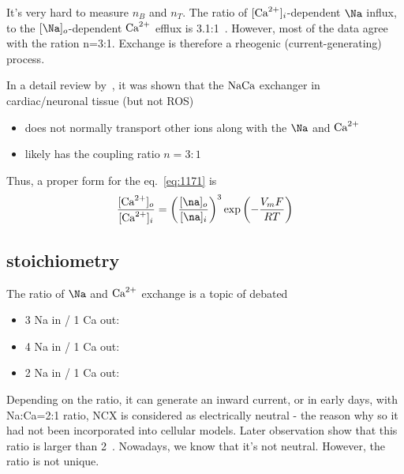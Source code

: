 It's very hard to measure $n_B$ and $n_T$. The ratio of $[{\text{Ca}^{2+}}]_i$-dependent
$\Na$ influx, to the $[\Na]_o$-dependent ${\text{Ca}^{2+}}$ efflux is
3.1:1~\citep{blaustein1975}. However, most of the data agree with the ration
n=3:1. Exchange is therefore a rheogenic (current-generating) process.


In a detail review by~\citep{blaustein1999}, it was shown that the
${\text{NaCa}}$ exchanger in cardiac/neuronal tissue (but not ROS)
\begin{itemize}
\item does not normally transport other ions along with the $\Na$ and ${\text{Ca}^{2+}}$
\item likely has the coupling ratio $n=3:1$
\end{itemize}
Thus, a proper form for the eq.~\eqref{eq:1171} is
\begin{equation}
  \label{eq:1175}
  \frac{[\Ca]_o}{[\Ca]_i} = \left(\frac{[\na]_o}{[\na]_i}\right)^3
  \exp\left( -\frac{V_mF}{RT} \right)
\end{equation}

\subsection{stoichiometry}

The ratio of $\Na$ and ${\text{Ca}^{2+}}$ exchange is a topic of debated
\begin{itemize}
  \item 3 Na in / 1 Ca out: ~\citep{reeves1984,kimura1987} 
  
  \item 4 Na in / 1 Ca out: ~\citep{mullins1979, mullins1991, fukioka2000}
  
  \item 2 Na in / 1 Ca out: ~\citep{niedergerke1963} 
\end{itemize}

Depending on the ratio, it can generate an inward current, or in early days,
with Na:Ca=2:1 ratio, NCX is considered as electrically neutral - the reason
why so it had not been incorporated into cellular models.
Later observation show that this ratio is larger than 2~\citep{blaustein1974}.
Nowadays, we know that it's not neutral. However, the ratio is not unique.

